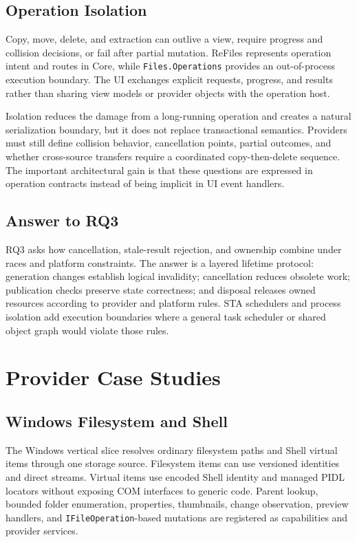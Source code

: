 \documentclass[10pt,a4paper,twoside]{article}
\begin{document}
\subsection{Operation Isolation}

Copy, move, delete, and extraction can outlive a view, require progress and collision decisions, or fail after
partial mutation. ReFiles represents operation intent and routes in Core, while \texttt{Files.Operations}
provides an out-of-process execution boundary. The UI exchanges explicit requests, progress, and results rather
than sharing view models or provider objects with the operation host.

Isolation reduces the damage from a long-running operation and creates a natural serialization boundary, but it
does not replace transactional semantics. Providers must still define collision behavior, cancellation points,
partial outcomes, and whether cross-source transfers require a coordinated copy-then-delete sequence. The
important architectural gain is that these questions are expressed in operation contracts instead of being
implicit in UI event handlers.

\subsection{Answer to RQ3}

RQ3 asks how cancellation, stale-result rejection, and ownership combine under races and platform constraints.
The answer is a layered lifetime protocol: generation changes establish logical invalidity; cancellation reduces
obsolete work; publication checks preserve state correctness; and disposal releases owned resources according to
provider and platform rules. STA schedulers and process isolation add execution boundaries where a general task
scheduler or shared object graph would violate those rules.

\section{Provider Case Studies}
\label{section:providers}

\subsection{Windows Filesystem and Shell}

The Windows vertical slice resolves ordinary filesystem paths and Shell virtual items through one storage
source. Filesystem items can use versioned identities and direct streams. Virtual items use encoded Shell
identity and managed PIDL locators without exposing COM interfaces to generic code. Parent lookup, bounded folder
enumeration, properties, thumbnails, change observation, preview handlers, and \texttt{IFileOperation}-based
mutations are registered as capabilities and provider services.
\end{document}
